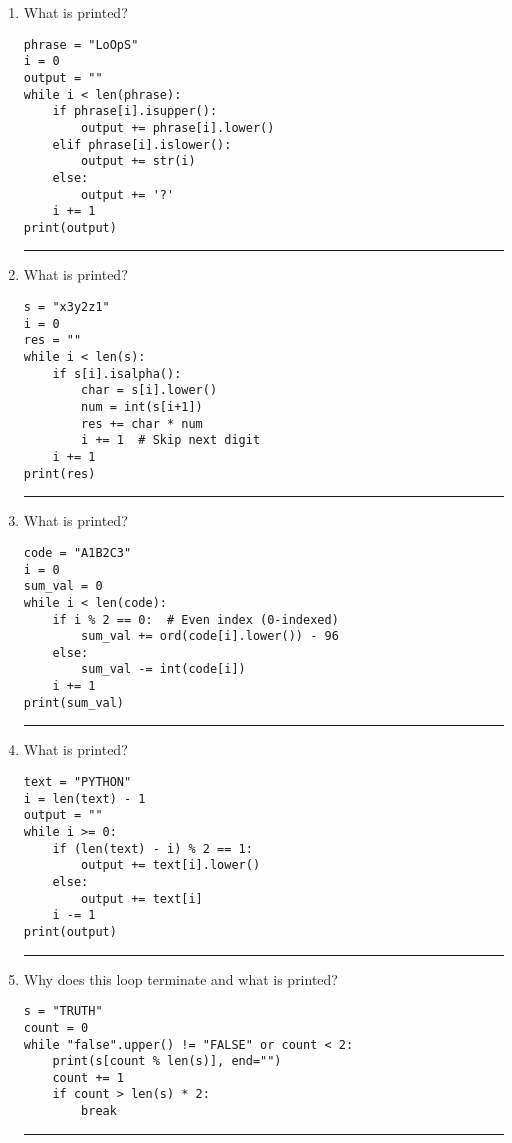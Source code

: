 \documentclass{article}
\begin{document}
\begin{enumerate}
    \item What is printed?
    \begin{lstlisting}
phrase = "LoOpS"
i = 0
output = ""
while i < len(phrase):
    if phrase[i].isupper():
        output += phrase[i].lower()
    elif phrase[i].islower():
        output += str(i)
    else:
        output += '?'
    i += 1
print(output)
    \end{lstlisting}
    \rule{\linewidth}{0.4pt}
    
    \item What is printed?
    \begin{lstlisting}
s = "x3y2z1"
i = 0
res = ""
while i < len(s):
    if s[i].isalpha():
        char = s[i].lower()
        num = int(s[i+1])
        res += char * num
        i += 1  # Skip next digit
    i += 1
print(res)
    \end{lstlisting}
    \rule{\linewidth}{0.4pt}
    
    \item What is printed?
    \begin{lstlisting}
code = "A1B2C3"
i = 0
sum_val = 0
while i < len(code):
    if i % 2 == 0:  # Even index (0-indexed)
        sum_val += ord(code[i].lower()) - 96
    else:
        sum_val -= int(code[i])
    i += 1
print(sum_val)
    \end{lstlisting}
    \rule{\linewidth}{0.4pt}
    
    \item What is printed?
    \begin{lstlisting}
text = "PYTHON"
i = len(text) - 1
output = ""
while i >= 0:
    if (len(text) - i) % 2 == 1:
        output += text[i].lower()
    else:
        output += text[i]
    i -= 1
print(output)
    \end{lstlisting}
    \rule{\linewidth}{0.4pt}
    
    \item Why does this loop terminate and what is printed?
    \begin{lstlisting}
s = "TRUTH"
count = 0
while "false".upper() != "FALSE" or count < 2:
    print(s[count % len(s)], end="")
    count += 1
    if count > len(s) * 2:
        break
    \end{lstlisting}
    \rule{\linewidth}{0.4pt}
\end{enumerate}
\end{document}
